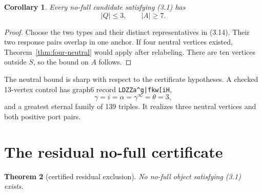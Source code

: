 \documentclass[11pt]{article}
\newtheorem{theorem}{Theorem}[section]
\newtheorem{corollary}[theorem]{Corollary}
\theoremstyle{definition}
\theoremstyle{remark}
\newcommand{\gaminf}{\gamma^{\infty}}
\begin{document}
\begin{corollary}\label{cor:q3}
Every no-full candidate satisfying (3.1) has
\[
  |Q|\leq3,\qquad |A|\geq7.
\tag{5.5}
\]
\end{corollary}

\begin{proof}
Choose the two types and their distinct representatives in (3.14).  Their
two response pairs overlap in one anchor.  If four neutral vertices
existed, Theorem~\ref{thm:four-neutral} would apply after relabeling.
There are ten vertices outside \(S\), so the bound on \(A\) follows.
\end{proof}

The neutral bound is sharp with respect to the certificate hypotheses.  A
checked 13-vertex control has graph6 record
\verb!LDZZa^g|fkw[iH!,
\[
  \gamma=i=\alpha=\gaminf=\theta=3,
\tag{5.6}
\]
and a greatest eternal family of 139 triples.  It realizes three neutral
vertices and both positive port pairs.

\section{The residual no-full certificate}\label{sec:residual}

\begin{theorem}[certified residual exclusion]\label{thm:residual}
No no-full object satisfying (3.1) exists.
\end{theorem}
\end{document}
